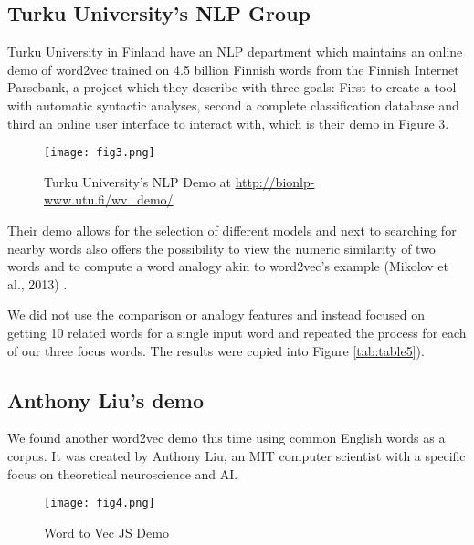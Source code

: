 \documentclass[12pt, usenames, dvipsnames]{report}
\begin{document}
\begin{flushleft}
\subsection{Turku University’s NLP Group}

Turku University in Finland have an NLP department which maintains an online demo of word2vec trained on 4.5 billion Finnish words from the Finnish Internet Parsebank, a project which they describe with three goals:
First to create a tool with automatic syntactic analyses, second a complete classification database and third an online user interface to interact with, which is their demo in Figure 3.

\vspace*{1.2em}
\begin{figure}[!htbp]
  \hspace*{-3.666em}
  \texttt{[image: fig3.png]}
  \caption{Turku University’s NLP Demo at \url{http://bionlp-www.utu.fi/wv_demo/}}
  \label{fig:figure3}
\end{figure}
\vspace*{1.2em}

Their demo allows for the selection of different models and next to searching
for nearby words also offers the possibility to view the numeric similarity of two words and to compute a word analogy akin to word2vec's example  (Mikolov et al., 2013) \cite{mikolov2013}.

We did not use the comparison or analogy features and instead focused on getting 10 related words for a single input word and repeated the process for each of our three focus words.
The results were copied into Figure \ref{tab:table5}).

\subsection{Anthony Liu’s demo}

We found another word2vec demo this time using common English words as a corpus.
It was created by Anthony Liu, an MIT computer scientist with a specific focus on theoretical neuroscience and AI.

\vspace*{1.2em}
\begin{figure}[!htbp]
  \hspace*{-3.666em}
  \texttt{[image: fig4.png]}
  \caption{Word to Vec JS Demo}
  \label{fig:figure4}
\end{figure}
\vspace*{1.2em}


\end{flushleft}
\end{document}
